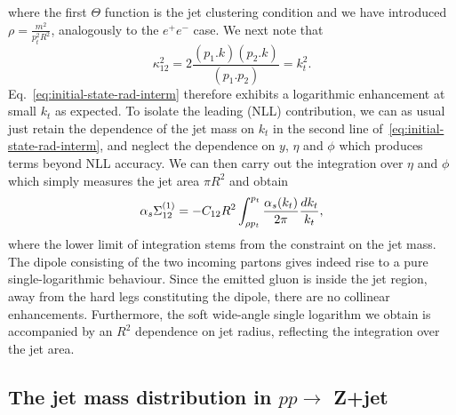where the first $\Theta$ function is the jet clustering condition and
we have introduced $\rho= \frac{m^2}{p_t^2 R^2}$, analogously to the
$e^+ e^-$ case.
%
We next note that
\begin{equation}
\kappa^2_{12} =  2 \frac{(p_1.k)(p_2.k)}{(p_1.p_2 )} = k_t^2.
\end{equation}
Eq.~\eqref{eq:initial-state-rad-interm} therefore exhibits a
logarithmic enhancement at small $k_t$ as expected.
%
To isolate the leading (NLL) contribution, we can as usual just retain
the dependence of the jet mass on $k_t$ in the second line
of~\eqref{eq:initial-state-rad-interm}, and neglect the dependence on
$y$, $\eta$ and $\phi$ which produces terms beyond NLL accuracy.
%
We can then carry out the integration over $\eta$ and $\phi$ which
simply measures the jet area $\pi R^2$ and obtain
\begin{equation}
\alpha_s \Sigma^{(1)}_{12} = -C_{12} {R^2} \int_{\rho p_t}^{p_t} \frac{\alpha_s (k_t)}{2 \pi} \frac{dk_t}{k_t},
\end{equation}
where the lower limit of integration stems from the constraint on the
jet mass. 
%
The dipole consisting of the two incoming partons gives indeed rise to
a pure single-logarithmic behaviour. Since the emitted gluon is inside
the jet region, away from the hard legs constituting the dipole, there
are no collinear enhancements. Furthermore, the soft wide-angle single
logarithm we obtain is accompanied by an $R^2$ dependence on jet
radius, reflecting the integration over the jet area.

\subsection{The jet mass distribution in $pp \to$ Z+jet}\label{sec:Zjet}

